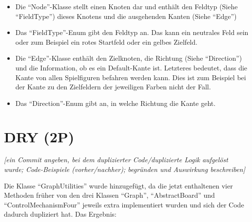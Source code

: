 \begin{itemize}
    \item Die \enquote{Node}-Klasse stellt einen Knoten dar und enthält den Feldtyp (Siehe \enquote{FieldType}) dieses Knotens und die ausgehenden Kanten (Siehe \enquote{Edge})
    \item Das \enquote{FieldType}-Enum gibt den Feldtyp an. Das kann ein neutrales Feld sein oder zum Beispiel ein rotes Startfeld oder ein gelbes Zielfeld.
    \item Die \enquote{Edge}-Klasse enthält den Zielknoten, die Richtung (Siehe \enquote{Direction}) und die Information, ob es ein Default-Kante ist. Letzteres bedeutet, dass die Kante von allen Spielfiguren befahren werden kann. Dies ist zum Beispiel bei der Kante zu den Zielfeldern der jeweiligen Farben nicht der Fall.
    \item Das \enquote{Direction}-Enum gibt an, in welche Richtung die Kante geht.
\end{itemize}

\newpage
\section{DRY (2P)}
\emph{[ein Commit angeben, bei dem duplizierter Code/duplizierte Logik aufgelöst wurde; Code-Beispiele
(vorher/nachher); begründen und Auswirkung beschreiben]}

\noindent Die Klasse \enquote{GraphUtilities} wurde hinzugefügt, da die jetzt enthaltenen vier Methoden früher von den drei Klassen \enquote{Graph}, \enquote{AbstractBoard} und \enquote{ControlMechanismFour} jeweils extra implementiert wurden und sich der Code dadurch dupliziert hat. Das Ergebnis:

